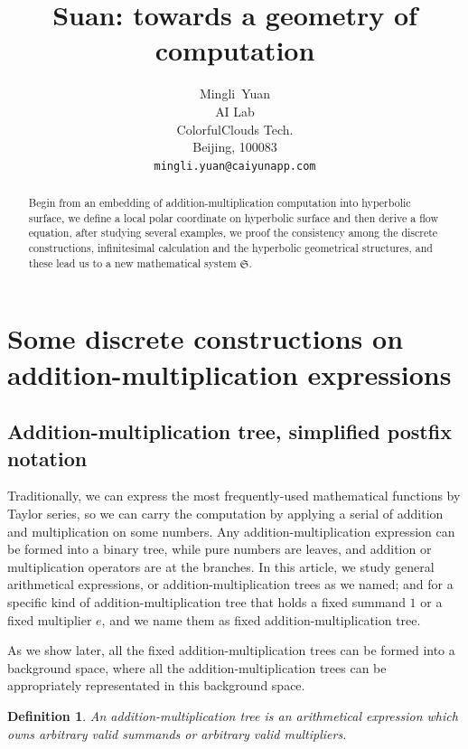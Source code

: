 \documentclass{article}
\title{Suan: towards a geometry of computation}
\author{
  Mingli~Yuan \\
  AI Lab \\
  ColorfulClouds Tech.\\
  Beijing, 100083 \\
  \texttt{mingli.yuan@caiyunapp.com} \\
}
\newtheorem{definition}{Definition}
\begin{document}
\maketitle

\begin{abstract}
    Begin from an embedding of addition-multiplication computation into hyperbolic surface, we define a local polar
    coordinate on hyperbolic surface and then derive a flow equation, after studying several examples, we proof the
    consistency among the discrete constructions, infinitesimal calculation and the hyperbolic geometrical structures, and
    these lead us to a new mathematical system $\mathfrak{S}$.
\end{abstract}


\setcounter{tocdepth}{2}
\tableofcontents

\section{Some discrete constructions on addition-multiplication expressions}\label{sec:discrete}

\subsection{Addition-multiplication tree, simplified postfix notation}\label{sec:amt}

Traditionally, we can express the most frequently-used mathematical functions by Taylor series,
so we can carry the computation by applying a serial of addition and multiplication on some numbers.
Any addition-multiplication expression can be formed into a binary tree, while pure numbers are leaves,
and addition or multiplication operators are at the branches. In this article, we study general arithmetical
expressions, or addition-multiplication trees as we named; and for a specific kind of addition-multiplication tree
that holds a fixed summand $1$ or a fixed multiplier $e$, and we name them as fixed addition-multiplication tree.

As we show later, all the fixed addition-multiplication trees can be formed into a background space,
where all the addition-multiplication trees can be appropriately representated in this background space.

\begin{definition}
An addition-multiplication tree is an arithmetical expression which owns arbitrary valid summands or arbitrary valid multipliers.
\end{definition}
\end{document}
